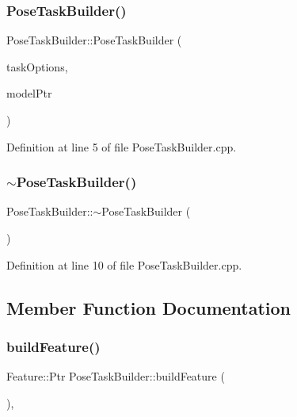 \subsubsection{\texorpdfstring{Pose\+Task\+Builder()}{PoseTaskBuilder()}}
{\footnotesize\ttfamily Pose\+Task\+Builder\+::\+Pose\+Task\+Builder (\begin{DoxyParamCaption}\item[{const \hyperlink{classocra_1_1TaskBuilderOptions}{Task\+Builder\+Options} \&}]{task\+Options,  }\item[{Model\+::\+Ptr}]{model\+Ptr }\end{DoxyParamCaption})}



Definition at line 5 of file Pose\+Task\+Builder.\+cpp.

\hypertarget{classocra_1_1PoseTaskBuilder_ad71d138985d6a4c6145818b5ab51b72a}{}\label{classocra_1_1PoseTaskBuilder_ad71d138985d6a4c6145818b5ab51b72a} 
\subsubsection{\texorpdfstring{$\sim$\+Pose\+Task\+Builder()}{~PoseTaskBuilder()}}
{\footnotesize\ttfamily Pose\+Task\+Builder\+::$\sim$\+Pose\+Task\+Builder (\begin{DoxyParamCaption}{ }\end{DoxyParamCaption})\hspace{0.3cm}{\ttfamily [virtual]}}



Definition at line 10 of file Pose\+Task\+Builder.\+cpp.



\subsection{Member Function Documentation}
\hypertarget{classocra_1_1PoseTaskBuilder_a9a5cd51010fb610f00eea794e1f8f701}{}\label{classocra_1_1PoseTaskBuilder_a9a5cd51010fb610f00eea794e1f8f701} 
\subsubsection{\texorpdfstring{build\+Feature()}{buildFeature()}}
{\footnotesize\ttfamily Feature\+::\+Ptr Pose\+Task\+Builder\+::build\+Feature (\begin{DoxyParamCaption}{ }\end{DoxyParamCaption})\hspace{0.3cm}{\ttfamily [protected]}, {\ttfamily [virtual]}}



